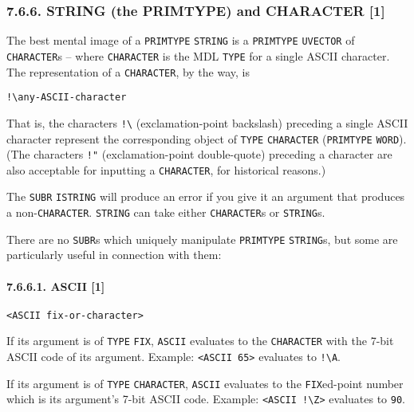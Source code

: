 \documentclass[a4paper,]{article}
\let\oldparagraph\paragraph
\renewcommand{\paragraph}[1]{\oldparagraph{#1}\mbox{}}
\begin{document}
\subsubsection{7.6.6. STRING (the PRIMTYPE) and CHARACTER {[}1{]}}\label{string-the-primtype-and-character-1}

The best mental image of a \texttt{PRIMTYPE} \texttt{STRING} is a \texttt{PRIMTYPE}
\texttt{UVECTOR} of \texttt{CHARACTER}s -- where \texttt{CHARACTER} is the MDL
\texttt{TYPE} for a single ASCII character. The representation of a \texttt{CHARACTER}, by the way, is

\begin{verbatim}
!\any-ASCII-character
\end{verbatim}

That is, the characters \texttt{!\textbackslash{}} (exclamation-point backslash) preceding a single ASCII character
represent the corresponding object of \texttt{TYPE} \texttt{CHARACTER} (\texttt{PRIMTYPE} \texttt{WORD}). (The characters
\texttt{!"}  (exclamation-point double-quote) preceding a character are also acceptable for inputting
a \texttt{CHARACTER}, for historical reasons.)

The \texttt{SUBR} \texttt{ISTRING} will produce an error if you give it an argument that produces a
non-\texttt{CHARACTER}. \texttt{STRING} can take either \texttt{CHARACTER}s or \texttt{STRING}s.

There are no \texttt{SUBR}s which uniquely manipulate \texttt{PRIMTYPE} \texttt{STRING}s, but some are particularly useful
in connection with them:

\paragraph{7.6.6.1. ASCII {[}1{]}}\label{ascii-1}

\begin{verbatim}
<ASCII fix-or-character>
\end{verbatim}

If its argument is of \texttt{TYPE} \texttt{FIX}, \texttt{ASCII} evaluates to the
\texttt{CHARACTER} with the 7-bit ASCII code of its argument. Example: \texttt{\textless{}ASCII\ 65\textgreater{}}
evaluates to \texttt{!\textbackslash{}A}.

If its argument is of \texttt{TYPE} \texttt{CHARACTER}, \texttt{ASCII} evaluates to the \texttt{FIX}ed-point number which
is its argument's 7-bit ASCII code. Example: \texttt{\textless{}ASCII\ !\textbackslash{}Z\textgreater{}} evaluates to
\texttt{90}.
\end{document}
